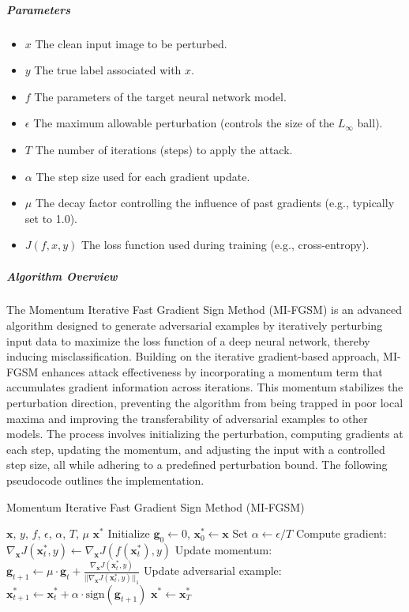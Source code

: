 \documentclass[../main.tex]{subfiles}
\begin{document}
\subparagraph{Parameters}
\begin{itemize}
    \item $x$ The clean input image to be perturbed.
    \item $y$ The true label associated with $x$.
    \item $f$ The parameters of the target neural network model.
    \item $\epsilon$ The maximum allowable perturbation (controls the size of the $L_\infty$ ball).
    \item $T$ The number of iterations (steps) to apply the attack.
    \item $\alpha$ The step size used for each gradient update.
    \item $\mu$ The decay factor controlling the influence of past gradients (e.g., typically set to 1.0).
    \item $J(f, x, y)$ The loss function used during training (e.g., cross-entropy).
\end{itemize}
\subparagraph{Algorithm Overview}

The Momentum Iterative Fast Gradient Sign Method (MI-FGSM) is an advanced algorithm designed to generate adversarial examples by iteratively perturbing input data to maximize the loss function of a deep neural network, thereby inducing misclassification. Building on the iterative gradient-based approach, MI-FGSM enhances attack effectiveness by incorporating a momentum term that accumulates gradient information across iterations. This momentum stabilizes the perturbation direction, preventing the algorithm from being trapped in poor local maxima and improving the transferability of adversarial examples to other models. The process involves initializing the perturbation, computing gradients at each step, updating the momentum, and adjusting the input with a controlled step size, all while adhering to a predefined perturbation bound. The following pseudocode outlines the implementation.
\begin{breakablealgorithm}{Momentum Iterative Fast Gradient Sign Method (MI-FGSM)}

\begin{algorithmic}[1]
\Require $\mathbf{x}$, $y$, $f$, $\epsilon$, $\alpha$, $T$, $\mu$
\Ensure $\mathbf{x}^*$
\State Initialize $\mathbf{g}_0 \gets 0$, $\mathbf{x}_0^* \gets \mathbf{x}$
\State Set $\alpha \gets \epsilon / T$
    \State Compute gradient: $\nabla_{\mathbf{x}} J(\mathbf{x}_t^*, y) \gets \nabla_{\mathbf{x}} J(f(\mathbf{x}_t^*), y)$
    \State Update momentum: $\mathbf{g}_{t+1} \gets \mu \cdot \mathbf{g}_t + \frac{\nabla_{\mathbf{x}} J(\mathbf{x}_t^*, y)}{||\nabla_{\mathbf{x}} J(\mathbf{x}_t^*, y)||_1}$
    \State Update adversarial example: $\mathbf{x}_{t+1}^* \gets \mathbf{x}_t^* + \alpha \cdot \text{sign}(\mathbf{g}_{t+1})$
\EndFor
\State \Return $\mathbf{x}^* \gets \mathbf{x}_T^*$
\end{algorithmic}
\end{breakablealgorithm}
\end{document}
